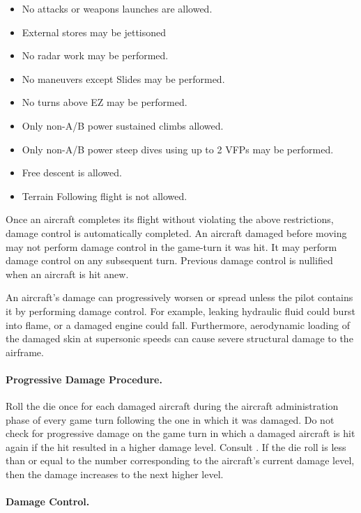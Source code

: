 \begin{advancedrules}
{\begin{itemize}
    \item No attacks or weapons launches are allowed.
    \item External stores may be jettisoned
    \item No radar work may be performed.
    \item No maneuvers except Slides may be performed.
    \item No turns above EZ may be performed.
    \item Only non-A/B power sustained climbs allowed.
    \item Only non-A/B power steep dives using up to 2 VFPs may be performed.
    \item Free descent is allowed.
    \item Terrain Following flight is not allowed.
\end{itemize}

Once an aircraft completes its flight without violating the above restrictions, damage control is automatically completed. An aircraft damaged before moving may not perform damage control in the game-turn it was hit. It may perform damage control on any subsequent turn. Previous damage control is nullified when an aircraft is hit anew.
}{

An aircraft's damage can progressively worsen or spread unless the pilot contains it by performing damage control. For example, leaking hydraulic fluid could burst into flame, or a damaged engine could fall. Furthermore, aerodynamic loading of the damaged skin at supersonic speeds can cause severe structural damage to the airframe.

\paragraph{Progressive Damage Procedure.} Roll the die once for each damaged aircraft during the aircraft administration phase of every game turn following the one in which it was damaged. Do not check for progressive damage on the game turn in which a damaged aircraft is hit again if the hit resulted in a higher damage level. Consult . If the die roll is less than or equal to the number corresponding to the aircraft's current damage level, then the damage increases to the next higher level.

\paragraph{Damage Control.} 
\label{rule:damage-control}

}
\end{advancedrules}
